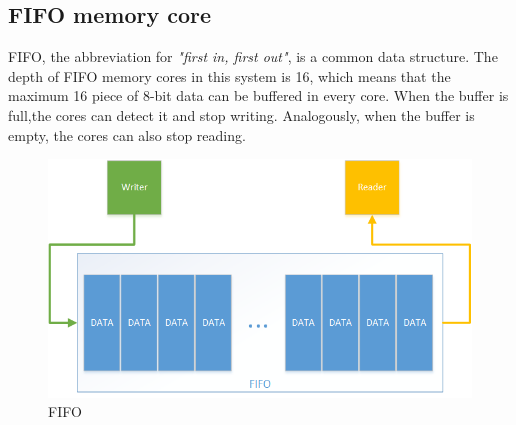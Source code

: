 \documentclass[conference]{IEEEtran}
\begin{document}
\subsection{FIFO memory core}
FIFO, the abbreviation for \emph{"first in, first out"}, is a common data structure. The depth of FIFO memory cores in this system is 16, which means that the maximum 16 piece of 8-bit data can be buffered in every core. When the buffer is full,the cores can detect it and stop writing. Analogously, when the buffer is empty, the cores can also stop reading.
\begin{figure}[h]
	\centering
	\includegraphics[scale=0.5]{fifo.png}
	\caption{FIFO}
	\label{fig:fifo}
\end{figure}
\end{document}
